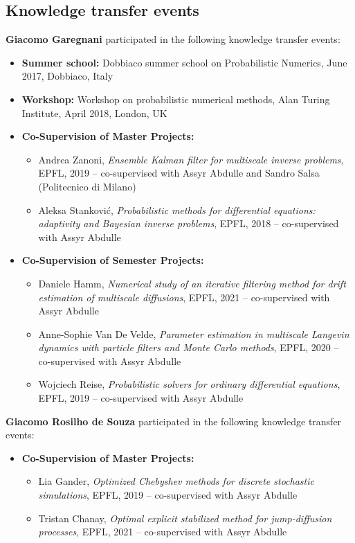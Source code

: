 \documentclass[10pt]{article}
\begin{document}
\subsection{Knowledge transfer events}

\textbf{Giacomo Garegnani} participated in the following knowledge transfer events:
\begin{itemize}
	\item \textbf{Summer school:} Dobbiaco summer school on Probabilistic Numerics, June 2017, Dobbiaco, Italy
	\item \textbf{Workshop:} Workshop on probabilistic numerical methods, Alan Turing Institute, April 2018, London, UK
	\item \textbf{Co-Supervision of Master Projects:} 
	\begin{itemize}
		\item Andrea Zanoni, \textit{Ensemble Kalman filter for multiscale inverse problems}, EPFL, 2019 -- co-supervised with Assyr Abdulle and Sandro Salsa (Politecnico di Milano)
		\item Aleksa Stanković, \textit{Probabilistic methods for differential equations: adaptivity and Bayesian inverse problems}, EPFL, 2018 -- co-supervised with Assyr Abdulle
	\end{itemize}
	\item \textbf{Co-Supervision of Semester Projects:}
	\begin{itemize}
		\item Daniele Hamm, \textit{Numerical study of an iterative filtering method for drift estimation of multiscale diffusions}, EPFL, 2021 -- co-supervised with Assyr Abdulle
		\item Anne-Sophie Van De Velde, \textit{Parameter estimation in multiscale Langevin dynamics with particle filters and Monte Carlo methods}, EPFL, 2020 -- co-supervised with Assyr Abdulle
		\item Wojciech Reise, \textit{Probabilistic solvers for ordinary differential equations}, EPFL, 2019 -- co-supervised with Assyr Abdulle
	\end{itemize}
\end{itemize}
%
\textbf{Giacomo Rosilho de Souza} participated in the following knowledge transfer events:
\begin{itemize}
	\item \textbf{Co-Supervision of Master Projects:}
	\begin{itemize}
		\item Lia Gander, \textit{Optimized Chebyshev methods for discrete stochastic simulations}, EPFL, 2019 -- co-supervised with Assyr Abdulle
		\item Tristan Chanay, \textit{Optimal explicit stabilized method for jump-diffusion processes}, EPFL, 2021 -- co-supervised with Assyr Abdulle
	\end{itemize} 
\end{itemize}
\end{document}
